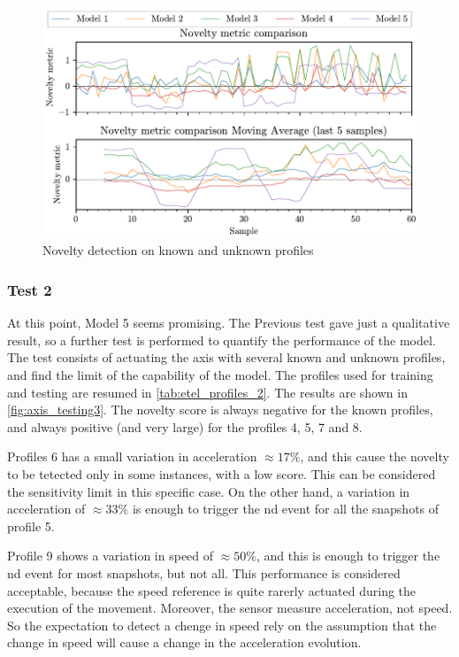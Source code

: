 \begin{figure}
    \centering
    \includegraphics{images/LinearMotor/Testing2.pdf}
    \caption{Novelty detection on known and unknown profiles}
    \label{fig:axis_testing2}
\end{figure}

\subsubsection{Test 2}
At this point, Model 5 seems promising. The Previous test gave just a qualitative result, so a further test is performed to quantify the performance of the model. The test consists of actuating the axis with several known and unknown profiles, and find the limit of the capability of the model. The profiles used for training and testing are resumed in \autoref{tab:etel_profiles_2}. The results are shown in \autoref{fig:axis_testing3}. The novelty score is always negative for the known profiles, and always positive (and very large) for the profiles 4, 5, 7 and 8. 

Profiles 6 has a small variation in acceleration $\approx 17\%$, and this cause the novelty to be tetected only in some instances, with a low score. This can be considered the sensitivity limit in this specific case. On the other hand, a variation in acceleration of $\approx 33\%$ is enough to trigger the \gls{nd} event for all the snapshots of profile 5. 

Profile 9 shows a variation in speed of $\approx 50\%$, and this is enough to trigger the \gls{nd} event for most snapshots, but not all. This performance is considered acceptable, because the speed reference is quite rarerly actuated during the execution of the movement. Moreover, the sensor measure acceleration, not speed. So the expectation to detect a chenge in speed rely on the assumption that the change in speed will cause a change in the acceleration evolution.


